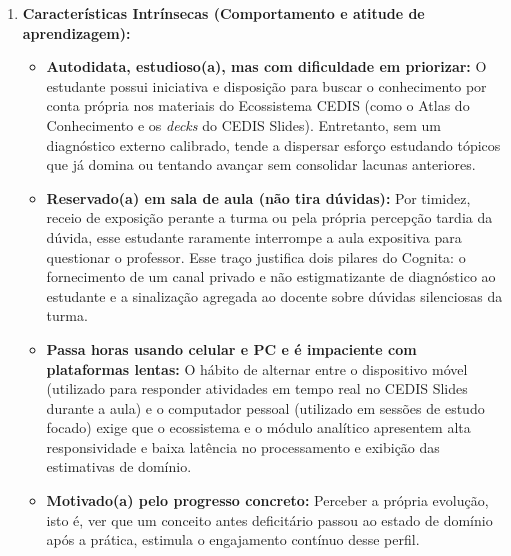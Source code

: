 \begin{enumerate}
    \item \textbf{Características Intrínsecas (Comportamento e atitude de aprendizagem):}
    \begin{itemize}
        \item \textbf{Autodidata, estudioso(a), mas com dificuldade em priorizar:} O estudante possui iniciativa e disposição para buscar o conhecimento por conta própria nos materiais do Ecossistema CEDIS (como o Atlas do Conhecimento e os \textit{decks} do CEDIS Slides). Entretanto, sem um diagnóstico externo calibrado, tende a dispersar esforço estudando tópicos que já domina ou tentando avançar sem consolidar lacunas anteriores.
        \item \textbf{Reservado(a) em sala de aula (não tira dúvidas):} Por timidez, receio de exposição perante a turma ou pela própria percepção tardia da dúvida, esse estudante raramente interrompe a aula expositiva para questionar o professor. Esse traço justifica dois pilares do Cognita: o fornecimento de um canal privado e não estigmatizante de diagnóstico ao estudante e a sinalização agregada ao docente sobre dúvidas silenciosas da turma.
        \item \textbf{Passa horas usando celular e PC e é impaciente com plataformas lentas:} O hábito de alternar entre o dispositivo móvel (utilizado para responder atividades em tempo real no CEDIS Slides durante a aula) e o computador pessoal (utilizado em sessões de estudo focado) exige que o ecossistema e o módulo analítico apresentem alta responsividade e baixa latência no processamento e exibição das estimativas de domínio.
        \item \textbf{Motivado(a) pelo progresso concreto:} Perceber a própria evolução, isto é, ver que um conceito antes deficitário passou ao estado de domínio após a prática, estimula o engajamento contínuo desse perfil.
    \end{itemize}


\end{enumerate}
